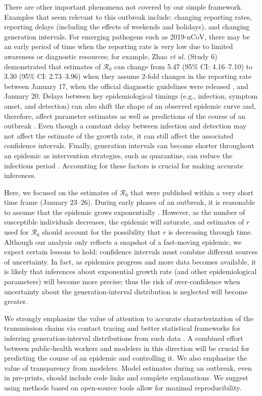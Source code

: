 \documentclass[12pt]{article}
\newcommand{\Ro}{\ensuremath{{\mathcal R}_{0}}\xspace}
\begin{document}
There are other important phenomena not covered by our simple framework. 
Examples that seem relevant to this outbreak include: changing reporting rates, reporting delays (including the effects of weekends and holidays), and changing generation intervals.
For emerging pathogens such as 2019-nCoV, there may be an early period of time when the reporting rate is very low due to limited awareness or diagnostic resources;
for example, Zhao \textit{et al.} \cite{zhaoncov} (Study 6) demonstrated that estimates of \Ro can change from 5.47 (95\% CI: 4.16--7.10) to 3.30 (95\% CI: 2.73--3.96) when they assume 2-fold changes in the reporting rate between January 17, when the official diagnostic guidelines were released \citep{who17protocol}, and January 20.
Delays between key epidemiological timings (e.g., infection, symptom onset, and detection) can also shift the shape of an observed epidemic curve and, therefore, affect parameter estimates as well as predictions of the course of an outbreak \citep{tariq2019assessing}.
Even though a constant delay between infection and detection may not affect the estimate of the growth rate, it can still affect the associated confidence intervals.
Finally, generation intervals can become shorter throughout an epidemic as intervention strategies, such as quarantine, can reduce the infectious period \citep{hethcote2002effects}.
Accounting for these factors is crucial for making accurate inferences.

Here, we focused on the estimates of \Ro that were published within a very short time frame (January 23--26).
During early phases of an outbreak, it is reasonable to assume that the epidemic grows exponentially \citep{anderson1991infectious}. However, as the number of susceptible individuals decreases, the epidemic will saturate, and estimates of $r$ used for \Ro should account for the possibility that $r$ is decreasing through time.
Although our analysis only reflects a snapshot of a fast-moving epidemic, we expect certain lessons to hold: confidence intervals must combine different sources of uncertainty. 
In fact, as epidemics progress and more data becomes available, it is likely that inferences about exponential growth rate (and other epidemiological parameters) will become more precise; thus the risk of over-confidence when uncertainty about the generation-interval distribution is neglected will become greater.

We strongly emphasize the value of attention to accurate characterization of the transmission chains via contact tracing and better statistical frameworks for inferring generation-interval distributions from such data \citep{britton2019estimation}.
A combined effort between public-health workers and modelers in this direction will be crucial for predicting the course of an epidemic and controlling it.
We also emphasize the value of transparency from modelers.
Model estimates during an outbreak, even in pre-prints, should include code links and complete explanations.
We suggest using methods based on open-source tools allow for maximal reproducibility.
\end{document}
